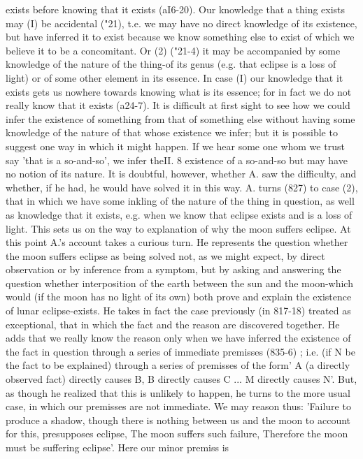{{{{{{{{{{{{{{{{{{{{{{{{{{{{{{{exists before knowing that it exists (aI6-20).
Our knowledge that a thing exists may (I) be accidental ("21),
t.e. we may have no direct knowledge of its existence, but have
inferred it to exist because we know something else to exist of
which we believe it to be a concomitant. Or (2) ("21-4) it may be
accompanied by some knowledge of the nature of the thing-of
its genus (e.g. that eclipse is a loss of light) or of some other
element in its essence. In case (I) our knowledge that it exists
gets us nowhere towards knowing what is its essence; for in fact
we do not really know that it exists (a24-7).
It is difficult at first sight to see how we could infer the existence
of something from that of something else without having some
knowledge of the nature of that whose existence we infer; but it
is possible to suggest one way in which it might happen. If we
hear some one whom we trust say 'that is a so-and-so', we infer theII. 8
existence of a so-and-so but may have no notion of its nature. It
is doubtful, however, whether A. saw the difficulty, and whether,
if he had, he would have solved it in this way.
A. turns (827) to case (2), that in which we have some inkling
of the nature of the thing in question, as well as knowledge that
it exists, e.g. when we know that eclipse exists and is a loss of
light. This sets us on the way to explanation of why the moon
suffers eclipse. At this point A.'s account takes a curious turn.
He represents the question whether the moon suffers eclipse as
being solved not, as we might expect, by direct observation or
by inference from a symptom, but by asking and answering the
question whether interposition of the earth between the sun and
the moon-which would (if the moon has no light of its own) both
prove and explain the existence of lunar eclipse-exists. He takes
in fact the case previously (in 817-18) treated as exceptional, that
in which the fact and the reason are discovered together. He adds
that we really know the reason only when we have inferred the
existence of the fact in question through a series of immediate
premisses (835-6) ; i.e. (if N be the fact to be explained) through
a series of premisses of the form' A (a directly observed fact)
directly causes B, B directly causes C ... M directly causes N'.
But, as though he realized that this is unlikely to happen, he
turns to the more usual case, in which our premisses are not
immediate. We may reason thus: 'Failure to produce a shadow,
though there is nothing between us and the moon to account for
this, presupposes eclipse, The moon suffers such failure, Therefore
the moon must be suffering eclipse'. Here our minor premiss is
}}}}}}}}}}}}}}}}}}}}}}}}}}}}}}}
